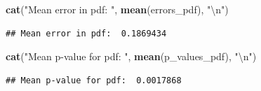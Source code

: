 \documentclass[a4paper]{article}
\newenvironment{Shaded}{\begin{snugshade}}{\end{snugshade}}
\newcommand{\CharTok}[1]{\textcolor[rgb]{0.31,0.60,0.02}{#1}}
\newcommand{\KeywordTok}[1]{\textcolor[rgb]{0.13,0.29,0.53}{\textbf{#1}}}
\newcommand{\NormalTok}[1]{#1}
\newcommand{\StringTok}[1]{\textcolor[rgb]{0.31,0.60,0.02}{#1}}
\begin{document}
\begin{enumerate}[a)]
\begin{Shaded}
\begin{Highlighting}[]
\KeywordTok{cat}\NormalTok{(}\StringTok{"Mean error in pdf: "}\NormalTok{, }\KeywordTok{mean}\NormalTok{(errors_pdf), }\StringTok{"}\CharTok{\textbackslash{}n}\StringTok{"}\NormalTok{)}
\end{Highlighting}
\end{Shaded}

\begin{verbatim}
## Mean error in pdf:  0.1869434
\end{verbatim}

\begin{Shaded}
\begin{Highlighting}[]
\KeywordTok{cat}\NormalTok{(}\StringTok{"Mean p-value for pdf: "}\NormalTok{, }\KeywordTok{mean}\NormalTok{(p_values_pdf), }\StringTok{"}\CharTok{\textbackslash{}n}\StringTok{"}\NormalTok{)}
\end{Highlighting}
\end{Shaded}

\begin{verbatim}
## Mean p-value for pdf:  0.0017868
\end{verbatim}

	
\end{enumerate}
\end{document}
